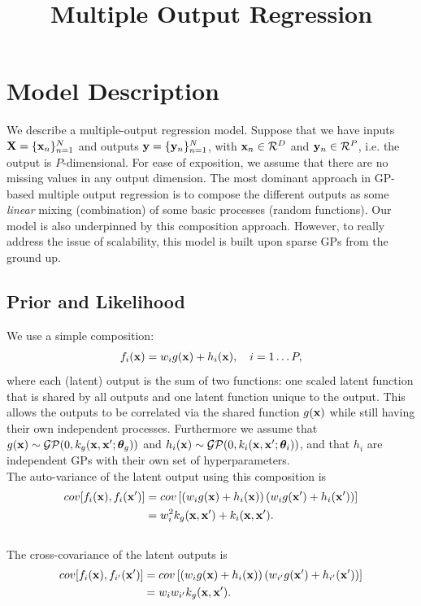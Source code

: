\documentclass{article} %
\title{Multiple Output Regression}
\begin{document}
\maketitle
\linenumbers

\section{Model Description}
We describe a multiple-output regression model.
Suppose that we have inputs $\mathbf{X} = \{\mathbf{x}_n\}_{n=1}^N$ and outputs $\mathbf{y} = \{\mathbf{y}_n\}_{n=1}^N$, with $\mathbf{x}_n \in \mathcal{R}^D$ and $\mathbf{y}_n \in \mathcal{R}^P$, i.e. the output is $P$-dimensional.
For ease of exposition, we assume that there are no missing values in any output dimension.
The most dominant approach in GP-based multiple output regression is to compose the different outputs as some \textit{linear} mixing (combination) of some basic processes (random functions).
Our model is also underpinned by this composition approach.
However, to really address the issue of scalability, this model is built upon sparse GPs from the ground up.


\subsection{Prior and Likelihood}
We use a simple composition:
\begin{align}
f_i(\mathbf{x}) = w_i g(\mathbf{x}) + h_i(\mathbf{x}), \quad i = 1 \hdots P,
\end{align}
where each (latent) output is the sum of two functions: one scaled latent function that is shared by all outputs and one latent function unique to the output.
This allows the outputs to be correlated via the shared function $g(\mathbf{x})$ while still having their own independent processes.
Furthermore we assume that $g(\mathbf{x}) \sim \mathcal{GP}(0, k_g(\mathbf{x},\mathbf{x}'; \boldsymbol{ \theta }_g))$ and $h_i(\mathbf{x}) \sim \mathcal{GP}(0, k_i(\mathbf{x},\mathbf{x}'; \boldsymbol{ \theta }_i))$, and that $h_i$ are independent GPs with their own set of hyperparameters. \\

\noindent The auto-variance of the latent output using this composition is
\begin{align}
\nonumber
cov[f_i(\mathbf{x}), f_i(\mathbf{x}')] 
&= cov \left[ \left(w_i g(\mathbf{x}) + h_i(\mathbf{x}) \right) \left(w_{i} g(\mathbf{x}') + h_i(\mathbf{x}') \right) \right] \\
&= w_i^2 k_g(\mathbf{x}, \mathbf{x}') + k_i(\mathbf{x},\mathbf{x}').
\end{align}
\\
\noindent The cross-covariance of the latent outputs is
\begin{align}
\nonumber
cov[f_i(\mathbf{x}), f_{i'}(\mathbf{x}')] 
&= cov \left[ \left(w_i g(\mathbf{x}) + h_i(\mathbf{x}) \right) \left(w_{i'} g(\mathbf{x}') + h_{i'}(\mathbf{x}') \right) \right] \\
&= w_i w_{i'} k_g(\mathbf{x}, \mathbf{x}').
\end{align} 
\end{document}
